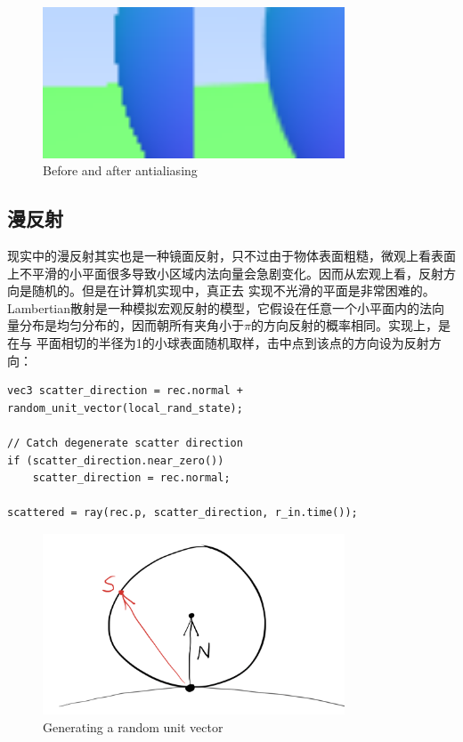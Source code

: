 \documentclass[UTF8, a4paper, 11pt]{article}
\begin{document}
\begin{figure}[H]
    \centering
    \includegraphics[width=0.8\textwidth]{antialias.png}
    \caption{Before and after antialiasing}
\end{figure}
\subsection{漫反射}
现实中的漫反射其实也是一种镜面反射，只不过由于物体表面粗糙，微观上看表面上不平滑的小平面很多导致小区域内法向量会急剧变化。因而从宏观上看，反射方向是随机的。但是在计算机实现中，真正去
实现不光滑的平面是非常困难的。Lambertian散射是一种模拟宏观反射的模型，它假设在任意一个小平面内的法向量分布是均匀分布的，因而朝所有夹角小于$\pi$的方向反射的概率相同。实现上，是在与
平面相切的半径为1的小球表面随机取样，击中点到该点的方向设为反射方向：
\begin{lstlisting}
vec3 scatter_direction = rec.normal + random_unit_vector(local_rand_state);

// Catch degenerate scatter direction
if (scatter_direction.near_zero())
    scatter_direction = rec.normal;

scattered = ray(rec.p, scatter_direction, r_in.time());
\end{lstlisting}
\begin{figure}[H]
    \centering
    \includegraphics[width=0.8\textwidth]{rand-unitvec.png}
    \caption{Generating a random unit vector}
\end{figure}
\end{document}
